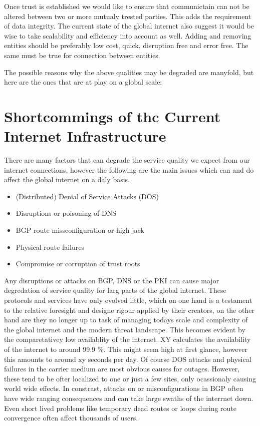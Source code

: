 \documentclass[../eva1_scion.tex]{subfiles}
\begin{document}
Once trust is established we would like to ensure that communictain can not be altered between two or more mutualy trested parties. This adds the requirement of data integrity. The current state of the global internet also suggest it would be wise to take scalability and efficiency into account as well. Adding and removing entities should be preferably low cost, quick, disruption free and error free. The same must be true for connection between entities.

The possible reasons why the above qualities may be degraded are manyfold, but here are the ones that are at play on a global scale:

\section{Shortcommings of thc Current Internet Infrastructure}%
\label{sec:shortcommings}

There are many factors that can degrade the service quality we expect from our internet connections, however the following are the main issues which can and do affect the global internet on a daly basis.

\begin{itemize}
    \item (Distributed) Denial of Service Attacks (DOS)
    \item Disruptions or poisoning of DNS
    \item BGP route missconfiguration or high jack
    \item Physical route failures
    \item Compromise or corruption of trust roots
\end{itemize}

Any disruptions or attacks on BGP, DNS or the PKI can cause major degredation of service quality for larg parts of the global internet. These protocols and services have only evolved little, which on one hand is a testament to the relative foresight and designe rigour applied by their creators, on the other hand are they no longer up to task of managing todays scale and complexity of the global internet and the modern threat landscape. This becomes evident by the comparetativey low availablity of the internet. XY calculates the availability of the internet to around 99.9 \%. This might seem high at first glance, however this amounts to around xy seconds per day. Of course DOS attacks and physical failures in the carrier medium are most obvious causes for outages. However, these tend to be ofter localized to one or just a few sites, only ocassionaly causing world wide effects. In constrast, attacks on or misconfigurations in BGP often have wide ranging consequences and can take large swaths of the interrnet down. Even short lived problems like temporary dead routes or loops during route convergence often affect thousands of users.
\end{document}
